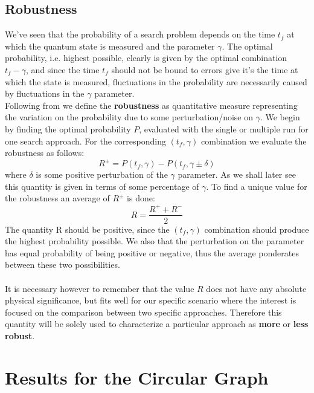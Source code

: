     \subsection{Robustness}
        We've seen that the probability of a search problem depends on the time $t_f$ at which the quantum state is measured and the parameter $\gamma$. The optimal probability, i.e. highest possible, clearly is given by the optimal combination $t_f-\gamma$, and since the time $t_f$ should not be bound to errors give it's the time at which the state is measured, fluctuations in the probability are necessarily caused by fluctuations in the $\gamma$ parameter. \\
        Following from \cite{SH.HungS.Hietala2019} we define the \textbf{robustness} as quantitative measure representing the variation on the probability due to some perturbation/noise on $\gamma$.
        We begin by finding the optimal probability $P$, evaluated with the single or multiple run for one search approach. For the corresponding $(t_f,\gamma)$ combination we evaluate the robustness as follows:
        \begin{equation}
            R ^\pm = P(t_f, \gamma) - P(t_f, \gamma \pm \delta)
        \end{equation}
        where $\delta$ is some positive perturbation of the $\gamma$ parameter. As we shall later see this quantity is given in terms of some percentage of $\gamma$. To find a unique value for the robustness an average of $R^\pm$ is done:
        \begin{equation}
            R = \frac{R^++ R^-}{2}
        \end{equation}
        The quantity R should be positive, since the $(t_f,\gamma)$ combination should produce the highest probability possible. We also that the perturbation on the parameter has equal probability of being positive or negative, thus the average ponderates between these two possibilities. \\ \\It is necessary however to remember that the value $R$ does not have any absolute physical significance, but fits well for our specific scenario where the interest is focused on the comparison between two specific approaches. Therefore this quantity will be solely used to characterize a particular approach as \textbf{more} or \textbf{less robust}.

\section{Results for the Circular Graph}

